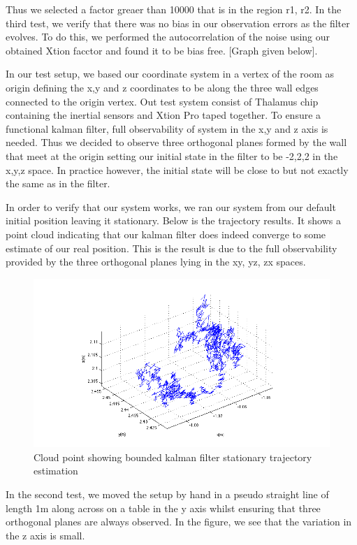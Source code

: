 \documentclass[]{article}
\begin{document}
{Thus we selected a factor greaer than 10000 that is in the region r1, r2.
In the third test, we verify that there was no bias in our observation errors as the filter evolves. To do this, we performed the autocorrelation of the noise using our obtained Xtion facctor and found it to be bias free. [Graph given below].
 
In our test setup, we based our coordinate system in a vertex of the room as origin defining the x,y and z coordinates to be along the three wall edges connected to the origin vertex. Out test system consist of Thalamus chip containing the inertial sensors and Xtion Pro taped together. To ensure a functional kalman filter, full observability of system in the x,y and z axis is needed. Thus we decided to observe three orthogonal planes formed by the wall that meet at the origin setting our initial state in the filter to be -2,2,2 in the x,y,z space. In practice however, the initial state will be close to but not exactly the same as in the filter.

In order to verify that our system works, we ran our system from our default initial position leaving it stationary. Below is the trajectory results. It shows a point cloud indicating that our kalman filter does indeed converge to some estimate of our real position. This is the result is due to the full observability provided by the three orthogonal planes lying in the xy, yz, zx spaces.

\begin{figure}[H]
	\begin{center}
		\includegraphics[width = \textwidth]{stationaryTraj.png}
	\end{center}
	\caption{Cloud point showing bounded kalman filter stationary trajectory estimation}
	\label{fig:stationary_trajectory}
\end{figure}
In the second test, we moved the setup by hand in a pseudo straight line of length 1m along across on a table in the y axis whilst ensuring that three orthogonal planes are always observed. In the figure, we see that the variation in the z axis is small. 

}
\end{document}

